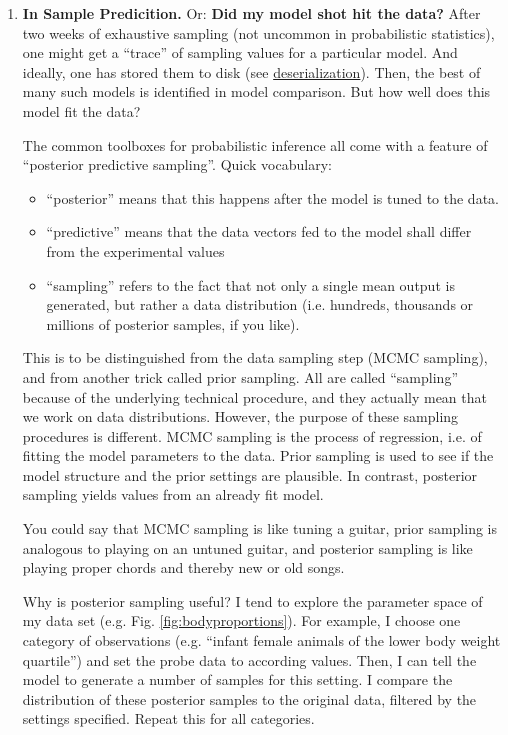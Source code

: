 \begin{enumerate}
\item \textbf{In Sample Predicition.}
\label{sec:org369b808}
Or: \textbf{Did my model shot hit the data?}
After two weeks of exhaustive sampling (not uncommon in probabilistic statistics), one might get a ``trace'' of sampling values for a particular model.
And ideally, one has stored them to disk (see \hyperref[workflow:deserialization]{deserialization}).
Then, the best of many such models is identified in model comparison.
But how well does this model fit the data?

The common toolboxes for probabilistic inference all come with a feature of ``posterior predictive sampling''.
Quick vocabulary:
\begin{itemize}
\item ``posterior'' means that this happens after the model is tuned to the data.
\item ``predictive'' means that the data vectors fed to the model shall differ from the experimental values
\item ``sampling'' refers to the fact that not only a single mean output is generated, but rather a data distribution (i.e. hundreds, thousands or millions of posterior samples, if you like).
\end{itemize}

This is to be distinguished from the data sampling step (MCMC sampling), and from another trick called prior sampling.
All are called ``sampling'' because of the underlying technical procedure, and they actually mean that we work on data distributions.
However, the purpose of these sampling procedures is different.
MCMC sampling is the process of regression, i.e. of fitting the model parameters to the data.
Prior sampling is used to see if the model structure and the prior settings are plausible.
In contrast, posterior sampling yields values from an already fit model.

You could say that MCMC sampling is like tuning a guitar, prior sampling is analogous to playing on an untuned guitar, and posterior sampling is like playing proper chords and thereby new or old songs.


Why is posterior sampling useful?
I tend to explore the parameter space of my data set (e.g. Fig. \ref{fig:bodyproportions}).
For example, I choose one category of observations (e.g. ``infant female animals of the lower body weight quartile'') and set the probe data to according values.
Then, I can tell the model to generate a number of samples for this setting.
I compare the distribution of these posterior samples to the original data, filtered by the settings specified.
Repeat this for all categories.


\end{enumerate}
